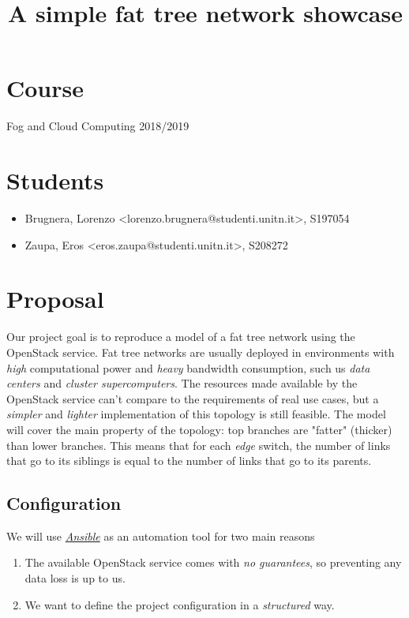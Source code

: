 \documentclass[a4paper]{article}
\date{}
\title{A simple fat tree network showcase}
\begin{document}
\maketitle
\section*{Course}
\label{sec-1}
Fog and Cloud Computing 2018/2019
\section*{Students}
\label{sec-2}
\begin{itemize}
\item Brugnera, Lorenzo <lorenzo.brugnera@studenti.unitn.it>, S197054
\item Zaupa, Eros <eros.zaupa@studenti.unitn.it>, S208272
\end{itemize}
\section*{Proposal}
\label{sec-3}
Our project goal is to reproduce a model of a fat tree network using
the OpenStack service. Fat tree networks are usually deployed in
environments with \emph{high} computational power and \emph{heavy} bandwidth
consumption, such us \emph{data centers} and \emph{cluster supercomputers}. The
resources made available by the OpenStack service can't compare to the
requirements of real use cases, but a \emph{simpler} and \emph{lighter}
implementation of this topology is still feasible. The model will
cover the main property of the topology: top branches are "fatter"
(thicker) than lower branches. This means that for each \emph{edge} switch,
the number of links that go to its siblings is equal to the number of
links that go to its parents.
\subsection*{Configuration}
\label{sec-3-1}
We will use \emph{\href{https://www.ansible.com/}{Ansible}} as an automation tool for two main reasons
\begin{enumerate}
\item The available OpenStack service comes with \emph{no guarantees}, so
preventing any data loss is up to us.
\item We want to define the project configuration in a \emph{structured} way.
\end{enumerate}
\end{document}
